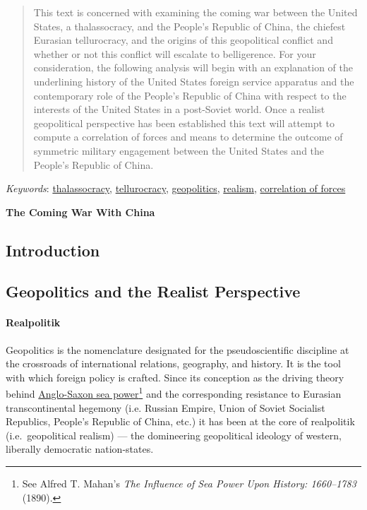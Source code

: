 \documentclass[12pt]{article}
\date{}
\author{\textbf{\Large{The Coming War With China}}\\ \textsc{Michael D. Brodskiy}\\ Department of Political Science, Diablo Valley College\\ POLSC-250: International Relations\\ Professor Kropf\\ July 15, 2021}
\begin{document}
\maketitle
\thispagestyle{empty}

\newpage

\setcounter{page}{1}

\begin{abstract}
  This text is concerned with examining the coming war between the United States, a thalassocracy, and the People's Republic of China, the chiefest Eurasian tellurocracy, and the origins of this geopolitical conflict and whether or not this conflict will escalate to belligerence. For your consideration, the following analysis will begin with an explanation of the underlining history of the United States foreign service apparatus and the contemporary role of the People's Republic of China with respect to the interests of the United States in a post-Soviet world. Once a realist geopolitical perspective has been established this text will attempt to compute a correlation of forces and means to determine the outcome of symmetric military engagement between the United States and the People's Republic of China. 
\end{abstract}

\emph{Keywords}: \underline{thalassocracy}, \underline{tellurocracy}, \underline{geopolitics},  \underline{realism}, \underline{correlation of forces}

\newpage

\tableofcontents
\listoffigures

\newpage

\begin{center}
  \LARGE{\textbf{The Coming War With China}}
\end{center}

\begin{center}
  \section{Introduction} 
\end{center}
\begin{center}
\subsection{Geopolitics and the Realist Perspective}
\end{center}
\paragraph{Realpolitik} Geopolitics is the nomenclature designated for the pseudoscientific discipline at the crossroads of international relations, geography, and history. It is the tool with which foreign policy is crafted. Since its conception as the driving theory behind \underline{Anglo-Saxon sea power}\footnote{See Alfred T. Mahan's \emph{The Influence of Sea Power Upon History: 1660–1783} (1890).} and the corresponding resistance to Eurasian transcontinental hegemony (i.e. Russian Empire, Union of Soviet Socialist Republics, People's Republic of China, etc.) it has been at the core of realpolitik (i.e.\ geopolitical realism) — the domineering geopolitical ideology of western, liberally democratic nation-states.
\end{document}
